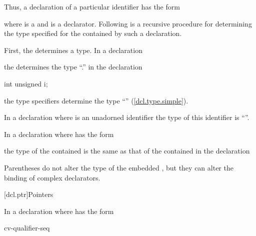 \pnum
Thus, a declaration of a particular identifier has the form

\begin{ncsimplebnf}
\end{ncsimplebnf}

where
is a
and
is a declarator.
Following is a recursive procedure for determining
the type specified for the contained
by such a declaration.

\pnum
First, the
determines a type.
In a declaration

\begin{ncsimplebnf}
\end{ncsimplebnf}

the
determines the type
``.''
\enterexample
in the declaration

\begin{codeblock}
int unsigned i;
\end{codeblock}

the type specifiers
determine the type
``''
(\ref{dcl.type.simple}).
\exitexample

\pnum
In a declaration
where
is an unadorned identifier the type of this identifier is
``''.

\pnum
In a declaration
where
has the form

\begin{ncsimplebnf}
\end{ncsimplebnf}

the type of the contained
is the same as that of the contained
in the declaration

\begin{ncsimplebnf}
\end{ncsimplebnf}

%
Parentheses do not alter the type of the embedded
,
but they can alter the binding of complex declarators.

[dcl.ptr]{Pointers}%
%

\pnum
In a declaration
where
has the form

\begin{ncsimplebnf}
\terminal{*} cv-qualifier-seq\opt {}
\end{ncsimplebnf}

